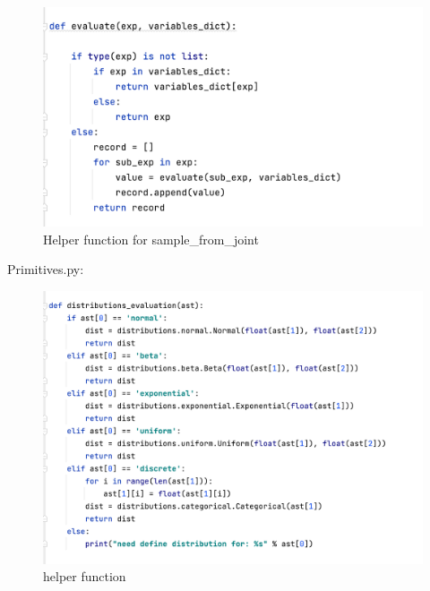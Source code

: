 \documentclass{article}
\begin{document}
\begin{enumerate}
\begin{figure}
	\centering
	\includegraphics[scale=0.6]{../figs/graph_code4}
	\caption{Helper function for sample_from_joint}
\end{figure}

\newpage
Primitives.py:
\begin{figure}[!htp]
	\centering
	\includegraphics[scale=0.6]{../figs/primitive_code1}
	\caption{helper function}
\end{figure}


\end{enumerate}
\end{document}
